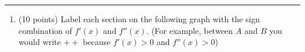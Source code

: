 \documentclass[11pt]{article}
\begin{document}
\Large


\medskip\hrule
\vspace{10pt}

\begin{enumerate}

\item (10 points) Label each section on the following graph with the sign combination of $f'(x)$ and $f''(x)$.  (For example,  between $A$ and $B$ you would write $++$ because $f'(x) > 0$ and $f''(x) > 0$)

\begin{center}

\begin{tikzpicture}[x=0.75pt,y=0.75pt,yscale=-1,xscale=1]


\end{tikzpicture}
\end{center}
\end{enumerate}
\end{document}
